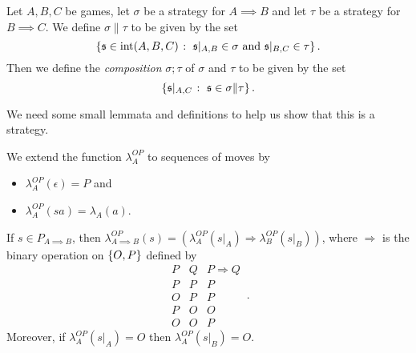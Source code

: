 \documentclass[11pt]{report}
\begin{document}
\begin{definition}
  Let $A,B,C$ be games, let $\sigma$ be a strategy for $A\implies B$ and let $\tau$ be a strategy for $B\implies C$.  
  We define $\sigma\|\tau$ to be given by the set
  \[
    \{\mathfrak s\in\operatorname{int}(A,B,C)\;\colon\; \text{$\mathfrak s\vert_{A,B}\in\sigma$ and $\mathfrak s\vert_{B,C}\in\tau$}\}\,.
    \]
  Then we define the \emph{composition} $\sigma;\tau$ of $\sigma$ and $\tau$ to be given by the set
  \[
    \{\mathfrak s\vert_{A,C}\;\colon\; \mathfrak s\in\sigma\|\tau\}\,.
    \]
\end{definition}

We need some small lemmata and definitions to help us show that this is a strategy.

\begin{lemma}
  We extend the function $\lambda_A^{OP}$ to sequences of moves by
  \begin{itemize}
    \item $\lambda_A^{OP}(\epsilon)=P$ and
    \item $\lambda_A^{OP}(sa)=\lambda_A(a)$.
  \end{itemize}

  If $s\in P_{A\implies B}$, then $\lambda_{A\implies B}^{OP}(s)=(\lambda_A^{OP}(s\vert_A)\Rightarrow \lambda_B^{OP}(s\vert_B))$, where $\Rightarrow$ is the binary operation on $\{O,P\}$ defined by
  \[
    \begin{array}{cc|c}
      P & Q & P\Rightarrow Q \\
      \hline
      P & P & P \\
      O & P & P \\
      P & O & O \\
      O & O & P
    \end{array}\,.
    \]
  Moreover, if $\lambda_A^{OP}(s\vert_A)=O$ then $\lambda_A^{OP}(s\vert_B)=O$.
  \label{LemCompositionLemma}
\end{lemma}
\end{document}
